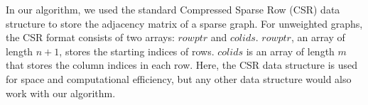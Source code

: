 \documentclass{vgtc}
\newcommand{\toolname}{{BatchLayout}}
\begin{document}
In our algorithm, we used the standard Compressed Sparse Row (CSR) data structure to store the adjacency matrix of a sparse graph. 
For unweighted graphs, the CSR format consists of two arrays: $rowptr$ and $colids$. $rowptr$, an array of length $n+1$, stores the starting indices of rows. $colids$ is an array of length $m$ that stores the column indices in each row. 
Here, the CSR data structure is used for space and computational efficiency, but any other data structure would also work with our algorithm.



\end{document}
